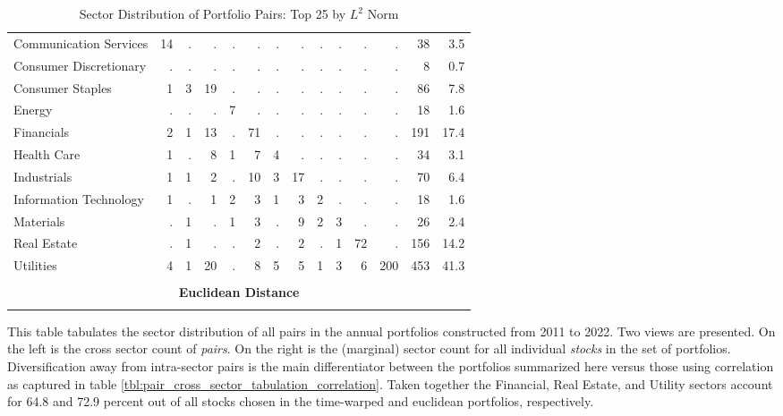\documentclass[12pt]{article}
\begin{document}
\begin{table}[hp]
\begin{tabular}{l r r r r r r r r r r r | r r}
        Communication Services   & 14 &  . &  . &  . &  . &  . &  . &  . &  . &  . &   . &  38 &  3.5 \\
        Consumer Discretionary   &  . &  . &  . &  . &  . &  . &  . &  . &  . &  . &   . &   8 &  0.7 \\
        Consumer Staples         &  1 &  3 & 19 &  . &  . &  . &  . &  . &  . &  . &   . &  86 &  7.8 \\
        Energy                   &  . &  . &  . &  7 &  . &  . &  . &  . &  . &  . &   . &  18 &  1.6 \\
        Financials               &  2 &  1 & 13 &  . & 71 &  . &  . &  . &  . &  . &   . & 191 & 17.4 \\
        Health Care              &  1 &  . &  8 &  1 &  7 &  4 &  . &  . &  . &  . &   . &  34 &  3.1 \\
        Industrials              &  1 &  1 &  2 &  . & 10 &  3 & 17 &  . &  . &  . &   . &  70 &  6.4 \\
        Information Technology   &  1 &  . &  1 &  2 &  3 &  1 &  3 &  2 &  . &  . &   . &  18 &  1.6 \\
        Materials                &  . &  1 &  . &  1 &  3 &  . &  9 &  2 &  3 &  . &   . &  26 &  2.4 \\
        Real Estate              &  . &  1 &  . &  . &  2 &  . &  2 &  . &  1 & 72 &   . & 156 & 14.2 \\
        Utilities                &  4 &  1 & 20 &  . &  8 &  5 &  5 &  1 &  3 &  6 & 200 & 453 & 41.3 \\
        \vspace{0.25 mm} \\
        \multicolumn{14}{c}{\textbf{Euclidean Distance}} \\
        \vspace{1 mm} \\
        \hline
    \end{tabular}
    \caption{Sector Distribution of Portfolio Pairs: Top 25 by $L^{2}$ Norm}
    \begin{tablenotes}
        \item{\footnotesize This table tabulates the sector distribution of all pairs in the annual portfolios constructed from 2011 to 2022. Two views are presented. On the left is the cross sector count of \textit{pairs}. On the right is the (marginal) sector count for all individual \textit{stocks} in the set of portfolios. Diversification away from intra-sector pairs is the main differentiator between the portfolios summarized here versus those using correlation as captured in table \ref{tbl:pair_cross_sector_tabulation_correlation}. Taken together the Financial, Real Estate, and Utility sectors account for 64.8 and 72.9 percent out of all stocks chosen in the time-warped and euclidean portfolios, respectively.}
    \end{tablenotes}
    \label{tbl:pair_cross_sector_tabulation_L2_measures}
\end{table}
\end{document}
